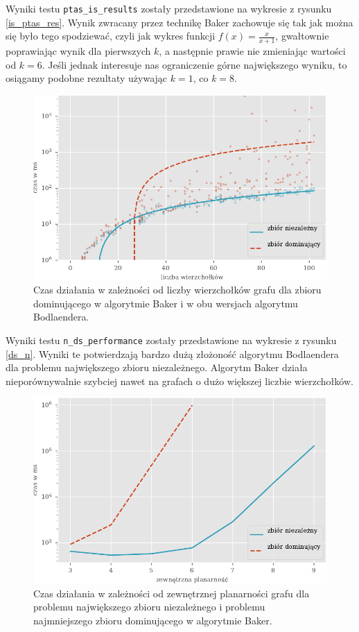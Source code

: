 \documentclass[twoside,a4paper,12pt]{report} %
\theoremstyle{break}
\begin{document}
Wyniki testu \texttt{ptas\_is\_results} zostały przedstawione na wykresie z rysunku \ref{is_ptas_res}. Wynik zwracany przez technikę Baker zachowuje się tak jak można się było tego spodziewać, czyli jak wykres funkcji $f(x)=\frac{x}{x+1}$, gwałtownie poprawiając wynik dla pierwszych $k$, a następnie prawie nie zmieniając wartości od $k=6$. Jeśli jednak interesuje nas ograniczenie górne największego wyniku, to osiągamy podobne rezultaty używając $k=1$, co $k=8$.

\begin{figure}[h!]
    \centering
    \includegraphics{wykresy/is_ds_n.pdf}
    \caption{Czas działania w zależności od liczby wierzchołków grafu dla zbioru dominującego w algorytmie Baker i w obu wersjach algorytmu Bodlaendera.}
    \label{is_ds_n}
\end{figure}

Wyniki testu \texttt{n\_ds\_performance} zostały przedstawione na wykresie z rysunku \ref{ds_n}. Wyniki te potwierdzają bardzo dużą złożoność algorytmu Bodlaendera dla problemu największego zbioru niezależnego. Algorytm Baker działa nieporównywalnie szybciej nawet na grafach o dużo większej liczbie wierzchołków.

\begin{figure}[h!]
    \centering
    \includegraphics{wykresy/is_ds_k.pdf}
    \caption{Czas działania w zależności od zewnętrznej planarności grafu dla problemu największego zbioru niezależnego i problemu najmniejszego zbioru dominującego w algorytmie Baker.}
    \label{is_ds_k}
\end{figure}
\end{document}

